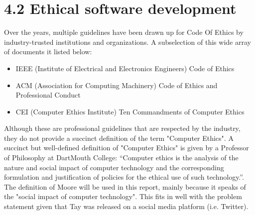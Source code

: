 \section*{\textbf{4.2 Ethical software development}}
Over the years, multiple guidelines have been drawn up for Code Of Ethics by industry-trusted institutions and organizations. A subselection of this wide array of documents it listed below:
\begin{itemize}
	\item IEEE (Institute of Electrical and Electronics Engineers) Code of Ethics\cite{IEEE}
	\item ACM (Association for Computing Machinery) Code of Ethics and Professional Conduct\cite{ACM}
	\item CEI (Computer Ethics Institute) Ten Commandments of Computer Ethics\cite{CEI}
\end{itemize}
Although these are professional guidelines that are respected by the industry, they do not provide a succinct definition of the term "Computer Ethics". A succinct but well-defined definition of "Computer Ethics" is given by a Professor of Philosophy at DartMouth College: “Computer ethics is the analysis of the nature and social impact of computer technology and the corresponding formulation and justification of policies for the ethical use of such technology.”\cite{Moor}.
The definition of Moore will be used in this report, mainly because it speaks of the "social impact of computer technology". This fits in well with the problem statement given that Tay was released on a social media platform (i.e. Twitter).
